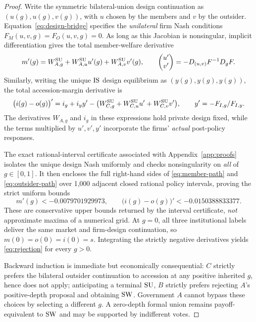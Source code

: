 \begin{proof}
Write the symmetric bilateral-union design continuation as
$(u(g),u(g),v(g))$, with $u$ chosen by the members and $v$
by the outsider. Equation~\eqref{eq:design-bridge} specifies
the \emph{unilateral} firm Nash conditions
$F_M(u,v,g)=F_O(u,v,g)=0$.
As long as this Jacobian is nonsingular, implicit
differentiation gives the total member-welfare derivative
\begin{equation}\label{eq:member-path}
 m'(g)=W_{A,g}^{\mathrm{SU}}
       +W_{A,u}^{\mathrm{SU}}u'(g)
       +W_{A,v}^{\mathrm{SU}}v'(g),\qquad
 \begin{pmatrix}u'\\v'\end{pmatrix}
 =-D_{(u,v)}F^{-1}D_gF.
\end{equation}
Similarly, writing the unique $\mathrm{IS}$ design equilibrium
as $(y(g),y(g),y(g))$, the total accession-margin derivative is
\begin{equation}\label{eq:outsider-path}
 \bigl(i(g)-o(g)\bigr)'
 =i_g+i_y y'
 -\bigl(W_{C,g}^{\mathrm{SU}}
       +W_{C,u}^{\mathrm{SU}}u'+W_{C,v}^{\mathrm{SU}}v'\bigr),
 \qquad y'=-F_{I,g}/F_{I,y}.
\end{equation}
The derivatives $W_{A,g}$ and $i_g$ in these expressions hold
private design fixed, while the terms multiplied by $u',v',y'$
incorporate the firms' \emph{actual} post-policy responses.

The exact rational-interval certificate associated with
Appendix~\ref{app:proofs} isolates the unique design Nash
uniformly and checks nonsingularity on \emph{all} of
$g\in[0,1]$. It then encloses the full right-hand sides
of \eqref{eq:member-path} and
\eqref{eq:outsider-path} over 1,000 adjacent closed
rational policy intervals, proving the strict uniform bounds
\begin{equation}\label{eq:signed-bounds}
  m'(g)<-0.0079701929973,\qquad
  \bigl(i(g)-o(g)\bigr)'<-0.0150388833377.
\end{equation}
These are conservative upper bounds returned by the interval
certificate, \emph{not} approximate maxima of a numerical grid.
At $g=0$, all three institutional labels deliver the same
market and firm-design continuation, so
$m(0)=o(0)=i(0)=s$. Integrating the strictly negative
derivatives yields \eqref{eq:rejection} for every $g>0$.

Backward induction is immediate but economically consequential:
$C$ strictly prefers the bilateral outsider continuation to
accession at any positive inherited $g$, hence does not apply;
anticipating a terminal $\mathrm{SU}$, $B$ strictly prefers rejecting
$A$'s positive-depth proposal and obtaining $\mathrm{SW}$.
Government $A$ cannot bypass these choices by selecting a
different $g$. A zero-depth formal union remains
payoff-equivalent to $\mathrm{SW}$ and may be supported by indifferent
votes.
\end{proof}

